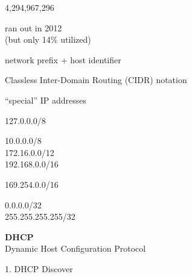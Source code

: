 \begin{cf}
	4,294,967,296
\end{cf}

\begin{cf}
	ran out in 2012\\
	(but only 14\% utilized)
\end{cf}

\begin{cf}[t]
	network prefix + host identifier
\end{cf}

\begin{cf}[t]
	Classless Inter-Domain Routing (CIDR) notation
\end{cf}

\begin{cf}
	``special'' IP addresses
\end{cf}

\begin{cf}
	127.0.0.0/8
\end{cf}

\begin{cf}
	10.0.0.0/8\\
  172.16.0.0/12\\
	192.168.0.0/16
\end{cf}

\begin{cf}
	169.254.0.0/16
\end{cf}

\begin{cf}
	0.0.0.0/32\\
	255.255.255.255/32
\end{cf}

\begin{cf}{
	\textbf{DHCP}\\
	Dynamic Host Configuration Protocol
}
\end{cf}

\begin{cf}[t]{
	1. DHCP Discover
}
\end{cf}

